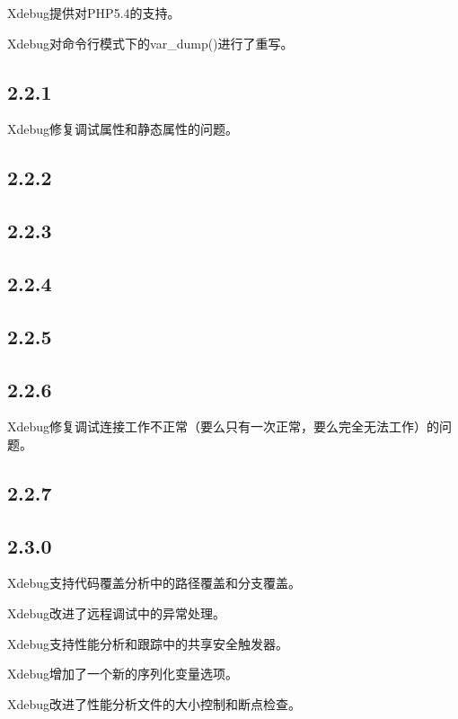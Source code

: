 \begin{compactitem}
\item Xdebug提供对PHP5.4的支持。
\item Xdebug对命令行模式下的var\_dump()进行了重写。
\end{compactitem}

\subsection{2.2.1}

Xdebug修复调试属性和静态属性的问题。

\subsection{2.2.2}

\subsection{2.2.3}


\subsection{2.2.4}


\subsection{2.2.5}


\subsection{2.2.6}


Xdebug修复调试连接工作不正常（要么只有一次正常，要么完全无法工作）的问题。

\subsection{2.2.7}


\subsection{2.3.0}


\begin{compactitem}
\item Xdebug支持代码覆盖分析中的路径覆盖和分支覆盖。
\item Xdebug改进了远程调试中的异常处理。
\item Xdebug支持性能分析和跟踪中的共享安全触发器。
\item Xdebug增加了一个新的序列化变量选项。
\item Xdebug改进了性能分析文件的大小控制和断点检查。
\end{compactitem}

